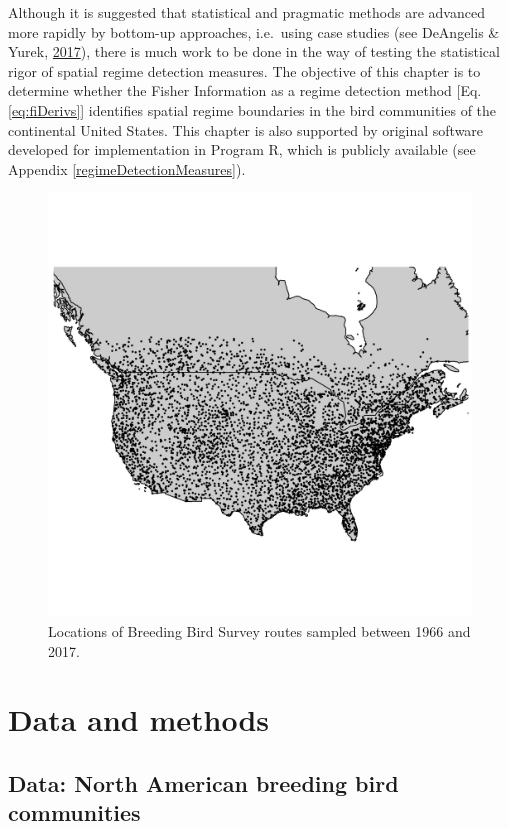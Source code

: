 \documentclass[12pt,twoside,openany]{reedthesis}
\begin{document}
Although it is suggested that statistical and pragmatic methods are advanced more rapidly by bottom-up approaches, i.e.~using case studies (see DeAngelis \& Yurek, \protect\hyperlink{ref-deangelis2017spatially}{2017}), there is much work to be done in the way of testing the statistical rigor of spatial regime detection measures. The objective of this chapter is to determine whether the Fisher Information as a regime detection method {[}Eq. \eqref{eq:fiDerivs}{]} identifies spatial regime boundaries in the bird communities of the continental United States. This chapter is also supported by original software developed for implementation in Program R, which is publicly available (see Appendix \ref{regimeDetectionMeasures}).
\begin{figure}[bth]

{\centering \includegraphics[width=0.85\linewidth]{./chapterFiles/fisherSpatial/figures/figsCalledInDiss/bbsRoutesUsed} 

}

\caption{Locations of Breeding Bird Survey routes sampled between 1966 and 2017.}\label{fig:bbsPoints}
\end{figure}
\hypertarget{data-and-methods}{%
\section{Data and methods}\label{data-and-methods}}

\hypertarget{data-north-american-breeding-bird-communities}{%
\subsection{Data: North American breeding bird communities}\label{data-north-american-breeding-bird-communities}}
\end{document}
